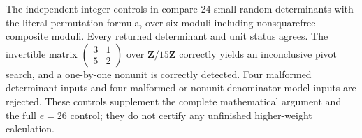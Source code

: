 The independent integer controls in
 compare 24 small random
determinants with the literal permutation formula, over six
moduli including nonsquarefree composite moduli.  Every
returned determinant and unit status agrees.  The invertible
matrix $\left(\begin{smallmatrix}3&1\\5&2\end{smallmatrix}\right)$
over $\mathbf Z/15\mathbf Z$ correctly yields an inconclusive
pivot search, and a one-by-one nonunit is correctly detected.
Four malformed determinant inputs and four malformed or
nonunit-denominator model inputs are rejected.  These controls
supplement the complete mathematical argument and the full
$e=26$ control; they do not certify any unfinished higher-weight
calculation.
